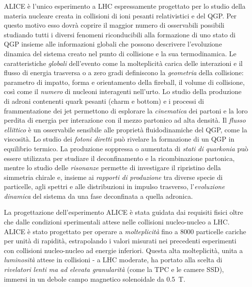         ALICE è l’unico esperimento a LHC espressamente progettato per lo studio della materia nucleare creata in collisioni di ioni pesanti relativistici e del QGP. Per questo motivo esso dovrà coprire il maggior numero di osservabili possibili studiando tutti i diversi fenomeni riconducibili alla formazione di uno stato di QGP insieme alle informazioni globali che possono descrivere l’evoluzione dinamica del sistema creato nel punto di collisione e la sua termodinamica. Le caratteristiche \textit{globali} dell’evento come la molteplicità carica delle interazioni e il flusso di energia trasversa o a zero gradi definiscono la \textit{geometria} della collisione: parametro di impatto, forma e orientamento della fireball, il volume di collisione, così come il \textit{numero} di nucleoni interagenti nell’urto. Lo studio della produzione di adroni contenenti quark pesanti (charm e bottom) e i processi di frammentazione dei jet permettono di esplorare la \textit{cinematica} dei partoni e la loro perdita di energia per interazione con il mezzo partonico ad alta densità. Il \textit{flusso ellittico} è un osservabile sensibile alle proprietà fluidodinamiche del QGP, come la viscosità. Lo studio dei \textit{fotoni diretti} può rivelare la formazione di un QGP in equilibrio termico. La produzione soppressa o aumentata di \textit{stati di quarkonia} può essere utilizzata per studiare il deconfinamento e la ricombinazione partonica, mentre lo studio delle \textit{risonanze} permette di investigare il ripristino della simmetria chirale e, insieme ai \textit{rapporti di produzione} tra diverse specie di particelle, agli spettri e alle distribuzioni in impulso trasverso, l’\textit{evoluzione dinamica} del sistema da una fase deconfinata a quella adronica.

        La progettazione dell’esperimento ALICE è stata guidata dai requisiti fisici oltre che dalle condizioni sperimentali attese nelle collisioni nucleo-nucleo a LHC. ALICE è stato progettato per operare a \textit{molteplicità} fino a 8000 particelle cariche per unità di rapidità, estrapolando i valori misurati nei precedenti esperimenti con collisioni nucleo-nucleo ad energie inferiori. Questa alta molteplicità, unita a \textit{luminosità} attese in collisioni - a LHC moderate, ha portato alla scelta di \textit{rivelatori lenti ma ad elevata granularità} (come la TPC e le camere SSD), immersi in un debole campo magnetico solenoidale da \qty{0.5}{\tesla}.

